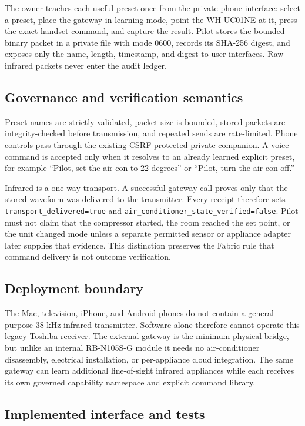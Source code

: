 The owner teaches each useful preset once from the private phone interface:
select a preset, place the gateway in learning mode, point the WH-UC01NE at it,
press the exact handset command, and capture the result.  Pilot stores the
bounded binary packet in a private file with mode 0600, records its SHA-256
digest, and exposes only the name, length, timestamp, and digest to user
interfaces.  Raw infrared packets never enter the audit ledger.

\subsection{Governance and verification semantics}

Preset names are strictly validated, packet size is bounded, stored packets are
integrity-checked before transmission, and repeated sends are rate-limited.
Phone controls pass through the existing CSRF-protected private companion.  A
voice command is accepted only when it resolves to an already learned explicit
preset, for example ``Pilot, set the air con to 22 degrees'' or ``Pilot, turn the
air con off.''

Infrared is a one-way transport.  A successful gateway call proves only that the
stored waveform was delivered to the transmitter.  Every receipt therefore
sets \texttt{transport\_delivered=true} and
\texttt{air\_conditioner\_state\_verified=false}.  Pilot must not claim that the
compressor started, the room reached the set point, or the unit changed mode
unless a separate permitted sensor or appliance adapter later supplies that
evidence.  This distinction preserves the Fabric rule that command delivery is
not outcome verification.

\subsection{Deployment boundary}

The Mac, television, iPhone, and Android phones do not contain a general-purpose
38-kHz infrared transmitter.  Software alone therefore cannot operate this
legacy Toshiba receiver.  The external gateway is the minimum physical bridge,
but unlike an internal RB-N105S-G module it needs no air-conditioner disassembly,
electrical installation, or per-appliance cloud integration.  The same gateway
can learn additional line-of-sight infrared appliances while each receives its
own governed capability namespace and explicit command library.

\subsection{Implemented interface and tests}

